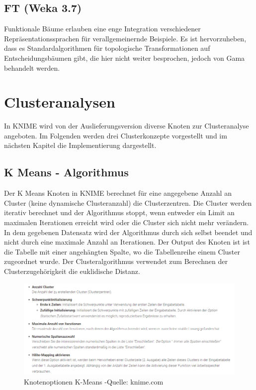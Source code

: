 \documentclass[12pt,					%
							 oneside,			%
							 a4paper,			%
							 halfparskip,		%
							 liststotoc,			%
							 bibtotoc,			%
							 fleqn,				%
							 pointlessnumbers]	%
							 {scrreprt}
\begin{document}
		\subsection{FT (Weka 3.7)}
			Funktionale Bäume erlauben eine enge Integration verschiedener Repräsentationssprachen für verallgemeinernde Beispiele. Es ist hervorzuheben, dass es Standardalgorithmen für topologische Transformationen auf Entscheidungsbäumen gibt, die hier nicht weiter besprochen, jedoch von Gama behandelt werden.\cite{Gama2004}
			

	\section{Clusteranalysen}
		In KNIME wird von der Auslieferungsversion diverse Knoten zur Clusteranalyse angeboten. Im Folgenden werden drei Clusterkonzepte vorgestellt und im nächsten Kapitel die Implementierung dargestellt.
		\subsection{K Means - Algorithmus}
		Der K Means Knoten in KNIME berechnet für eine angegebene Anzahl an Cluster (keine dynamische Clusteranzahl) die Clusterzentren. Die Cluster werden iterativ berechnet und der Algorithmus stoppt, wenn entweder ein Limit an maximalen Iterationen erreicht wird oder die Cluster sich nicht mehr verändern. In dem gegebenen Datensatz wird der Algorithmus durch sich selbst beendet und nicht durch eine maximale Anzahl an Iterationen. Der Output des Knoten ist ist die Tabelle mit einer angehängten Spalte, wo die Tabellenreihe einem Cluster zugeordnet wurde. Der Clusteralgorithmus verwendet zum Berechnen der Clusterzugehörigkeit die euklidische Distanz.
		\begin{figure}[h]
			\begin{center}
				\includegraphics[scale=0.7]{pictures/kmeans-knoten.png}
				\caption{Knotenoptionen K-Means -Quelle: knime.com}									

			\end{center}
		\end{figure}
		
\end{document}
